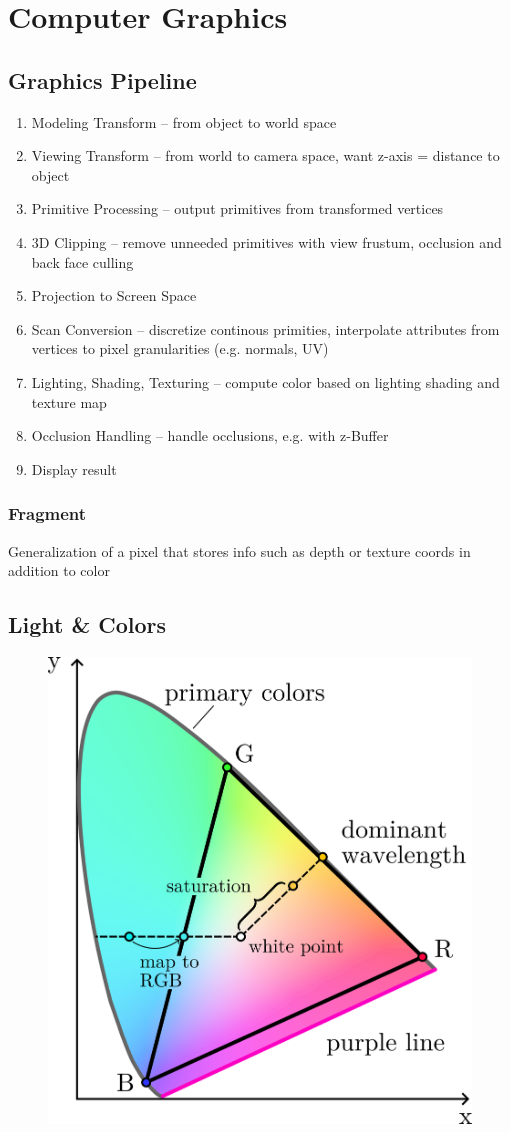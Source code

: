 \documentclass[a4paper,10pt]{article}
\begin{document}
\section{Computer Graphics}
\subsection{Graphics Pipeline}
\begin{enumerate}
    \item Modeling Transform -- from object to world space
    \item Viewing Transform -- from world to camera space, want z-axis = distance to object
    \item Primitive Processing -- output primitives from transformed vertices
    \item 3D Clipping -- remove unneeded primitives with view frustum, occlusion and back face culling
    \item Projection to Screen Space
    \item Scan Conversion -- discretize continous primities, interpolate attributes from vertices to pixel granularities (e.g. normals, UV)
    \item Lighting, Shading, Texturing -- compute color based on lighting shading and texture map
    \item Occlusion Handling -- handle occlusions, e.g. with z-Buffer
    \item Display result
\end{enumerate}

\subsubsection{Fragment} Generalization of a pixel that stores info such as depth or texture coords in addition to color

\subsection{Light \& Colors}

\begin{figure}[h]
    \centering
    \includegraphics[width=0.6\linewidth]{ciergb.png}
\end{figure}
\end{document}
